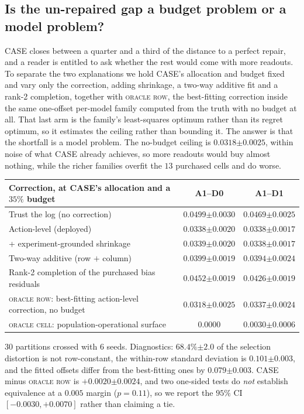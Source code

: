 \documentclass{article}
\theoremstyle{plain}
\theoremstyle{remark}
\newcommand{\se}[1]{{\scriptstyle\pm#1}}
\begin{document}
\subsection{Is the un-repaired gap a budget problem or a model problem?}
CASE closes between a quarter and a third of the distance to a perfect repair, and a reader is
entitled to ask whether the rest would come with more readouts. To separate the two explanations we hold CASE's
allocation and budget fixed and vary only the correction, adding shrinkage, a two-way additive fit
and a rank-2 completion, together with \textsc{oracle row}, the best-fitting correction inside the
same one-offset per-model family computed from the truth with no budget at all. That last arm is the
family's least-squares optimum rather than its regret optimum, so it estimates the ceiling rather
than bounding it. The answer is that the shortfall is a model problem. The no-budget ceiling is
$0.0318\se{0.0025}$, within noise of what CASE already achieves, so more readouts would buy almost
nothing, while the richer families overfit the $13$ purchased cells and do worse.

\begin{center}\footnotesize
\begin{tabular}{@{}lcc@{}}
\toprule
Correction, at CASE's allocation and a $35\%$ budget & A1--D0 & A1--D1\\
\midrule
Trust the log (no correction) & $0.0499\se{0.0030}$ & $0.0469\se{0.0025}$\\
Action-level (deployed) & $0.0338\se{0.0020}$ & $0.0338\se{0.0017}$\\
\;+ experiment-grounded shrinkage \citep{kallus2018removing,rosenman2023shrinkage} & $0.0339\se{0.0020}$ & $0.0338\se{0.0017}$\\
Two-way additive (row $+$ column) & $0.0399\se{0.0019}$ & $0.0394\se{0.0024}$\\
Rank-2 completion of the purchased bias residuals & $0.0452\se{0.0019}$ & $0.0426\se{0.0019}$\\
\addlinespace[2pt]
\textsc{oracle row}: best-fitting action-level correction, no budget & $0.0318\se{0.0025}$ & $0.0337\se{0.0024}$\\
\textsc{oracle cell}: population-operational surface & $0.0000$ & $0.0030\se{0.0006}$\\
\bottomrule
\end{tabular}
\end{center}
\noindent $30$ partitions crossed with $6$ seeds. Diagnostics: $68.4\%\se{2.0}$ of the selection
distortion is not row-constant, the within-row standard deviation is $0.101\se{0.003}$, and the
fitted offsets differ from the best-fitting ones by $0.079\se{0.003}$. CASE minus \textsc{oracle row}
is $+0.0020\se{0.0024}$, and two one-sided tests do \emph{not} establish equivalence at a $0.005$
margin ($p=0.11$), so we report the $95\%$ CI $[-0.0030,+0.0070]$ rather than claiming a tie.
\end{document}
